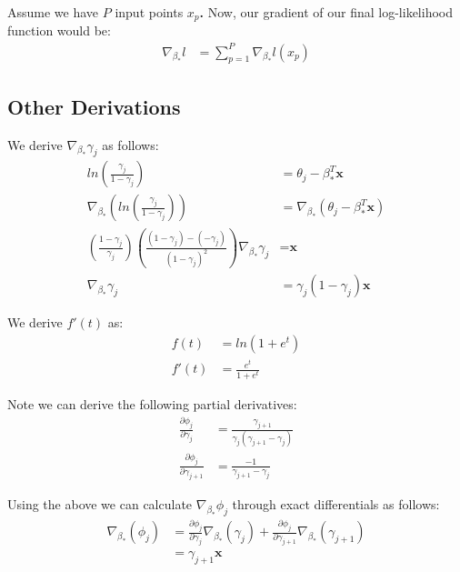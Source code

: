 \documentclass[a4paper, 11pt]{article}
\begin{document}
Assume we have $P$ input points \textbf{$x_p$.} Now, our gradient of our final log-likelihood function would be:
\begin{align}
    \nabla_{\beta_*}l &= \sum_{p=1}^P\nabla_{\beta_*}l(\textbf{$x_p$}) 
\end{align}

\subsection{Other Derivations}
We derive $\nabla_{\beta_*} \gamma_j$ as follows:
\begin{align}
    ln\left(\frac{\gamma_j}{1 - \gamma_j}\right) &= \theta_j - \beta_*^T\textbf{x} \\
    \nabla_{\beta_*} \left( ln\left(\frac{\gamma_j}{1 - \gamma_j}\right) \right) &= \nabla_{\beta_*} \left( \theta_j - \beta_*^T\textbf{x} \right) \\
    \left( \frac{1 - \gamma_j}{\gamma_j} \right) \left( \frac{(1 - \gamma_j) - (-\gamma_j)}{(1 - \gamma_j)^2} \right) \nabla_{\beta_*}\gamma_j &= \textbf{x} \\
    \nabla_{\beta_*}\gamma_j &= \gamma_j(1 - \gamma_j)\textbf{x}
\end{align}

We derive $f'(t)$ as:
\begin{align}
    f(t) &= ln(1+e^t) \\
    f'(t) &= \frac{e^t}{1+e^t}
\end{align}

Note we can derive the following partial derivatives:
\begin{align}
    \frac{\partial \phi_j}{\partial \gamma_j} &= \frac{\gamma_{j+1}}{\gamma_j(\gamma_{j+1} - \gamma_j)} \\
    \frac{\partial \phi_j}{\partial \gamma_{j+1}} &= \frac{-1}{\gamma_{j+1} - \gamma_j}
\end{align}

Using the above we can calculate $\nabla_{\beta_*} \phi_j$ through exact differentials as follows:
\begin{align}
    \nabla_{\beta_*}(\phi_j) &= \frac{\partial \phi_j}{\partial \gamma_j}\nabla_{\beta_*}(\gamma_j) + \frac{\partial \phi_j}{\partial \gamma_{j+1}}\nabla_{\beta_*}(\gamma_{j+1}) \\
    &= \gamma_{j+1}\textbf{x}
\end{align}


\end{document}

